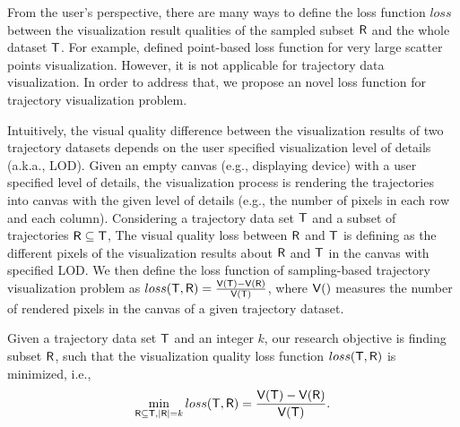 From the user’s perspective, there are many ways to define the loss function $loss$ between the visualization result qualities of the sampled subset $\mathsf{R}$ and the whole dataset $\mathsf{T}$.
For example, \cite{park2016visualization} defined point-based loss function for very large scatter points visualization.
However, it is not applicable for trajectory data visualization.
In order to address that, we propose an novel loss function for trajectory visualization problem.

Intuitively, the visual quality difference between the visualization results of two trajectory datasets depends on the user specified visualization level of details (a.k.a., LOD).
Given an empty canvas (e.g., displaying device) with a user specified level of details, 
the visualization process is rendering the trajectories into canvas with the given level of details (e.g., the number of pixels in each row and each column).
Considering a trajectory data set $\mathsf{T}$ and a subset of trajectories $\mathsf{R} \subseteq \mathsf{T}$,
The visual quality loss between $\mathsf{R}$ and $\mathsf{T}$ is defining as the different pixels of the visualization results about $\mathsf{R}$ and $\mathsf{T}$ in the canvas with specified LOD.
We then define the loss function of sampling-based trajectory visualization problem as $loss(\mathsf{T}, \mathsf{R}) = \frac{\mathsf{V}(\mathsf{T}) - \mathsf{V}(\mathsf{R})}{\mathsf{V}(\mathsf{T})}$,
where $\mathsf{V}()$ measures the number of rendered pixels in the canvas of a given trajectory dataset.

Given a trajectory data set $\mathsf{T}$ and an integer $k$,  our research objective is finding subset $\mathsf{R}$, such that  the visualization quality loss function $loss(\mathsf{T}, \mathsf{R})$ is minimized,
i.e.,
$$ \min_{\mathsf{R} \subseteq \mathsf{T}, |\mathsf{R}| = k}  loss(\mathsf{T}, \mathsf{R}) =  \frac{\mathsf{V}(\mathsf{T}) - \mathsf{V}(\mathsf{R})}{\mathsf{V}(\mathsf{T})}. $$ %






